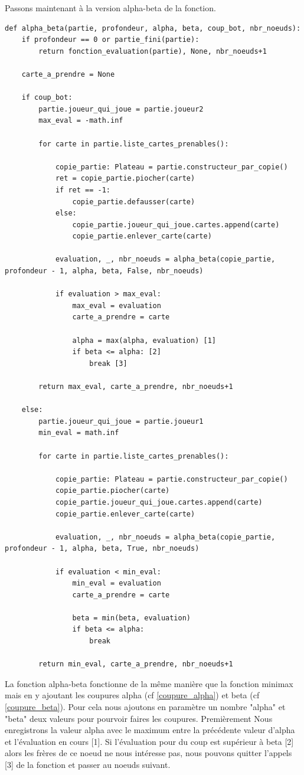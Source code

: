 \documentclass[12pt]{article}
\begin{document}
		Passons maintenant à la version alpha-beta de la fonction.
		\begin{lstlisting}
def alpha_beta(partie, profondeur, alpha, beta, coup_bot, nbr_noeuds):
	if profondeur == 0 or partie_fini(partie):
		return fonction_evaluation(partie), None, nbr_noeuds+1
	
	carte_a_prendre = None
	
	if coup_bot:
		partie.joueur_qui_joue = partie.joueur2
		max_eval = -math.inf
		
		for carte in partie.liste_cartes_prenables():
			
			copie_partie: Plateau = partie.constructeur_par_copie()
			ret = copie_partie.piocher(carte)
			if ret == -1:
				copie_partie.defausser(carte)
			else:
				copie_partie.joueur_qui_joue.cartes.append(carte)
				copie_partie.enlever_carte(carte)
			
			evaluation, _, nbr_noeuds = alpha_beta(copie_partie, profondeur - 1, alpha, beta, False, nbr_noeuds)
			
			if evaluation > max_eval:
				max_eval = evaluation
				carte_a_prendre = carte
				
				alpha = max(alpha, evaluation) [1]
				if beta <= alpha: [2]
					break [3]
				
		return max_eval, carte_a_prendre, nbr_noeuds+1
	
	else:
		partie.joueur_qui_joue = partie.joueur1
		min_eval = math.inf
		
		for carte in partie.liste_cartes_prenables():
			
			copie_partie: Plateau = partie.constructeur_par_copie()
			copie_partie.piocher(carte)
			copie_partie.joueur_qui_joue.cartes.append(carte)
			copie_partie.enlever_carte(carte)
			
			evaluation, _, nbr_noeuds = alpha_beta(copie_partie, profondeur - 1, alpha, beta, True, nbr_noeuds)
			
			if evaluation < min_eval:
				min_eval = evaluation
				carte_a_prendre = carte
				
				beta = min(beta, evaluation)
				if beta <= alpha:
					break
		
		return min_eval, carte_a_prendre, nbr_noeuds+1
		\end{lstlisting}
		La fonction alpha-beta fonctionne de la même manière que la fonction minimax mais en y ajoutant les coupures alpha (cf \ref{coupure_alpha}) et beta (cf \ref{coupure_beta}). Pour cela nous ajoutons en paramètre un nombre "alpha" et "beta" deux valeurs pour pourvoir faires les coupures. Premièrement Nous enregistrons la valeur alpha avec le maximum entre la précédente valeur d'alpha et l'évaluation en cours [1]. Si l'évaluation pour du coup est supérieur à beta [2] alors les frères de ce noeud ne nous intéresse pas, nous pouvons quitter l'appels [3] de la fonction et passer au noeuds suivant.
\end{document}
